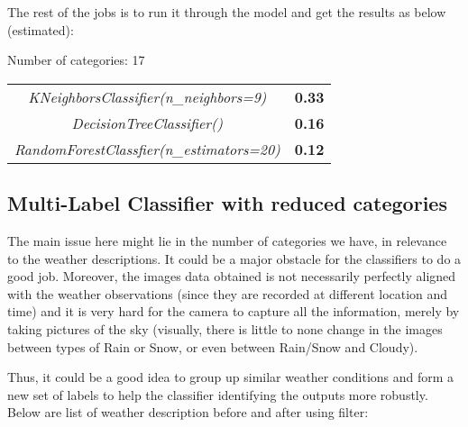The rest of the jobs is to run it through the model and get the results as below (estimated):

\begin{table} [h!]

Number of categories: 17 \\

\begin{tabular}{c|c} 
    \textit{KNeighborsClassifier(n\_neighbors=9)} & \textbf{0.33} \\
    \textit{DecisionTreeClassifier()} & \textbf{0.16} \\
    \textit{RandomForestClassfier(n\_estimators=20)} & \textbf{0.12}
\end{tabular}

\end{table}

\subsection{Multi-Label Classifier with reduced categories}
The main issue here might lie in the number of categories we have, in relevance to the weather descriptions. It could be a major obstacle for the classifiers to do a good job. Moreover, the images data obtained is not necessarily perfectly aligned with the weather observations (since they are recorded at different location and time) and it is very hard for the camera to capture all the information, merely by taking pictures of the sky (visually, there is little to none change in the images between types of Rain or Snow, or even between Rain/Snow and Cloudy).

Thus, it could be a good idea to group up similar weather conditions and form a new set of labels to help the classifier identifying the outputs more robustly. Below are list of weather description before and after using filter:


